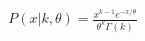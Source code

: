 \documentclass[preview]{standalone}
\begin{document}
\begin{align*}
P(x|k,\theta) = \frac{x^{k-1}e^{-x/\theta}}{\theta^k\Gamma(k)}
\end{align*}
\end{document}
